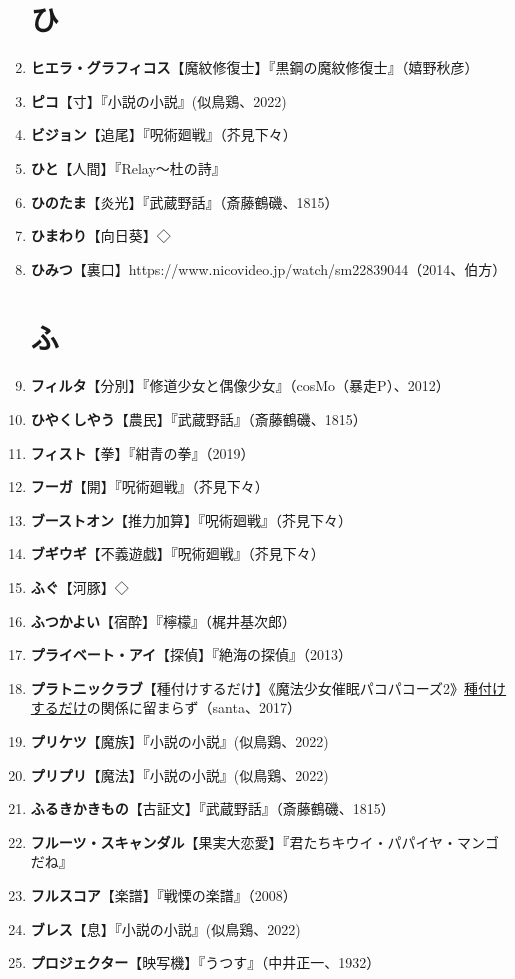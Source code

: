 \documentclass[twocolumn]{jsbook}
\newcommand{\ccite}[1]{《#1》}
\begin{document}
\begin{enumerate}
\section*{ひ}
    \item \textbf{ヒエラ・グラフィコス}【魔紋修復士】『黒鋼の魔紋修復士』（嬉野秋彦）
    \item \textbf{ピコ}【寸】『小説の小説』(似鳥鶏、2022)
    \item \textbf{ビジョン}【追尾】『呪術廻戦』（芥見下々）
    \item \textbf{ひと}【人間】『Relay〜杜の詩』
    \item \textbf{ひのたま}【炎光】『武蔵野話』（斎藤鶴磯、1815）
    \item \textbf{ひまわり}【向日葵】◇
    \item \textbf{ひみつ}【裏口】https://www.nicovideo.jp/watch/sm22839044（2014、伯方）
\section*{ふ}
    \item \textbf{フィルタ}【分別】『修道少女と偶像少女』（cosMo（暴走P）、2012）
    \item \textbf{ひやくしやう}【農民】『武蔵野話』（斎藤鶴磯、1815）
    \item \textbf{フィスト}【拳】『紺青の拳』（2019）
    \item \textbf{フーガ}【開】『呪術廻戦』（芥見下々）
    \item \textbf{ブーストオン}【推力加算】『呪術廻戦』（芥見下々）
    \item \textbf{ブギウギ}【不義遊戯】『呪術廻戦』（芥見下々）
    \item \textbf{ふぐ}【河豚】◇
    \item \textbf{ふつかよい}【宿酔】『檸檬』（梶井基次郎）
    \item \textbf{プライベート・アイ}【探偵】『絶海の探偵』（2013）
    \item \textbf{プラトニックラブ}【種付けするだけ】\ccite{魔法少女催眠パコパコーズ2}{\uline{種付けするだけ}の関係に留まらず}（santa、2017）
    \item \textbf{プリケツ}【魔族】『小説の小説』(似鳥鶏、2022)
    \item \textbf{プリプリ}【魔法】『小説の小説』(似鳥鶏、2022)
    \item \textbf{ふるきかきもの}【古証文】『武蔵野話』（斎藤鶴磯、1815）
    \item \textbf{フルーツ・スキャンダル}【果実大恋愛】『君たちキウイ・パパイヤ・マンゴだね』
    \item \textbf{フルスコア}【楽譜】『戦慄の楽譜』（2008）
    \item \textbf{ブレス}【息】『小説の小説』(似鳥鶏、2022)
    \item \textbf{プロジェクター}【映写機】『うつす』（中井正一、1932）

\end{enumerate}
\end{document}
